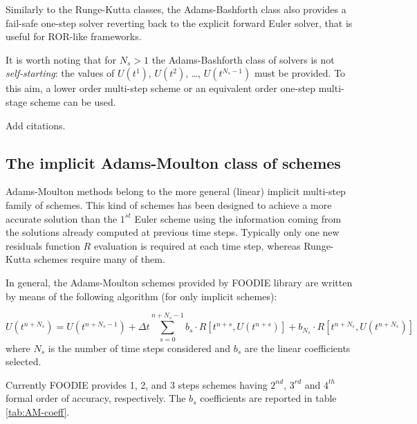 Similarly to the Runge-Kutta classes, the Adams-Bashforth class also provides a fail-safe one-step solver reverting back to the explicit forward Euler solver, that is useful for ROR-like frameworks.

It is worth noting that for $N_s>1$ the Adams-Bashforth class of solvers is not \emph{self-starting}: the values of $U\left(t^{1}\right)$, $U\left(t^{2}\right)$, \dots, $U\left(t^{N_s-1}\right)$ must be provided. To this aim, a lower order multi-step scheme or an equivalent order one-step multi-stage scheme can be used.

{\color{red} Add citations.}

\subsection{The implicit Adams-Moulton class of schemes}

Adams-Moulton methods belong to the more general (linear) implicit multi-step family of schemes. This kind of schemes has been designed to achieve a more accurate solution than the $1^{st}$ Euler scheme using the information coming from the solutions already computed at previous time steps. Typically only one new residuals function $R$ evaluation is required at each time step, whereas Runge-Kutta schemes require many of them.

In general, the Adams-Moulton schemes provided by FOODIE library are written by means of the following algorithm (for only implicit schemes):

\begin{equation}
  U\left(t^{n+N_s}\right) = U\left(t^{n+N_s-1}\right) +\Delta t \sum_{s=0}^{n+N_s-1}{ b_s \cdot R\left[t^{n+s}, U\left(t^{n+s}\right)\right]} + b_{N_s}\cdot R\left[t^{n+N_s}, U\left(t^{n+N_s}\right)\right]
\label{eq:AM}
\end{equation}
where $N_s$ is the number of time steps considered and $b_s$ are the linear coefficients selected.

Currently FOODIE provides 1, 2, and 3 steps schemes having $2^{nd}$, $3^{rd}$ and $4^{th}$ formal order of accuracy, respectively. The $b_s$ coefficients are reported in table \ref{tab:AM-coeff}.

\begin{table}[!ht]
  \centering
  \caption{Implicit Adams-Moulton coefficients\label{tab:AM-coeff}}
\end{table}

